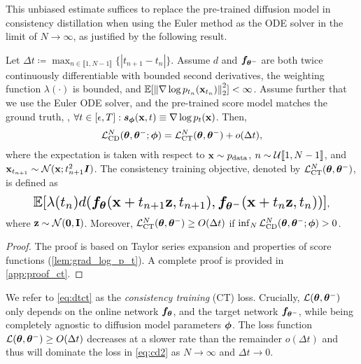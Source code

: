 This unbiased estimate suffices to replace the pre-trained diffusion model in consistency distillation when using the Euler method as the ODE solver in the limit of $N\to\infty$, as justified by the following result.
\begin{theorem}\label{thm:ct}
    Let $\Delta t \coloneqq \max_{n \in \llbracket 1, N-1\rrbracket}\{|t_{n+1} - t_{n}|\}$. Assume $d$ and ${\bm{f}}_{{\bm{\theta}}^{-}}$ are both twice continuously differentiable with bounded second derivatives, the weighting function $\lambda(\cdot)$ is bounded, and $\mathbb{E}[\left\lVert\nabla \log p_{t_n}({\mathbf{x}}_{t_{n}})\right\rVert_2^2] < \infty$. Assume further that we use the Euler ODE solver, and the pre-trained score model matches the ground truth, \ie, $\forall t\in[\epsilon, T]: {\bm{s}}_{{\bm{\phi}}}({\mathbf{x}}, t) \equiv \nabla \log p_t({\mathbf{x}})$. Then,
    \begin{align}
       \mathcal{L}_\text{CD}^N({\bm{\theta}}, {\bm{\theta}}^{-}; {\bm{\phi}}) = \mathcal{L}_\text{CT}^N({\bm{\theta}}, {\bm{\theta}}^{-}) + o(\Delta t),\label{eq:cd2}
    \end{align}
    where the expectation is taken with respect to ${\mathbf{x}} \sim p_\text{data}$, $n \sim \mathcal{U}\llbracket 1,N-1 \rrbracket$, and ${\mathbf{x}}_{t_{n+1}} \sim \mathcal{N}({\mathbf{x}}; t_{n+1}^2 {\bm{I}})$. The consistency training objective, denoted by $\mathcal{L}_\text{CT}^N({\bm{\theta}}, {\bm{\theta}}^{-})$, is defined as
    \begin{align}
        \resizebox{0.87\linewidth}{!}{$\displaystyle
        \mbb{E}[\lambda(t_n) d(\vf_\vtheta(\rvx + t_{n+1}\rvz, t_{n+1}), \vf_{\vtheta^{-}}(\rvx + t_n\rvz, t_n))]$},\label{eq:dtct}
    \end{align}
    where ${\mathbf{z}} \sim \mathcal{N}(\bf{0}, {\bm{I}})$. Moreover, $\mathcal{L}_\text{CT}^N({\bm{\theta}}, {\bm{\theta}}^{-}) \geq O(\Delta t)$ if $\inf_N \mathcal{L}_\text{CD}^N({\bm{\theta}}, {\bm{\theta}}^{-}; {\bm{\phi}}) > 0$.
\end{theorem}
\begin{proof}
    The proof is based on Taylor series expansion and properties of score functions (\cref{lem:grad_log_p_t}). A complete proof is provided in \cref{app:proof_ct}.
\end{proof}

We refer to \cref{eq:dtct} as the \emph{consistency training} (CT) loss. Crucially, $\mathcal{L}({\bm{\theta}}, {\bm{\theta}}^{-})$ only depends on the online network ${\bm{f}}_{\bm{\theta}}$, and the target network ${\bm{f}}_{{\bm{\theta}}^{-}}$, while being completely agnostic to diffusion model parameters ${\bm{\phi}}$. The loss function $\mathcal{L}({\bm{\theta}}, {\bm{\theta}}^{-}) \geq O(\Delta t)$ decreases at a slower rate than the remainder $o(\Delta t)$ and thus will dominate the loss in \cref{eq:cd2} as $N\to\infty$ and $\Delta t \to 0$.

